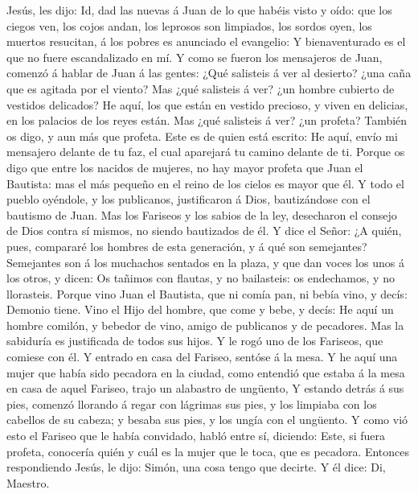 Jesús, les dijo: Id, dad las nuevas á Juan de lo que habéis visto y
oído: que los ciegos ven, los cojos andan, los leprosos son limpiados,
los sordos oyen, los muertos resucitan, á los pobres es anunciado el
evangelio:  Y bienaventurado es el que no fuere
escandalizado en mí.  Y como se fueron los mensajeros de
Juan, comenzó á hablar de Juan á las gentes: ¿Qué salisteis á ver al
desierto? ¿una caña que es agitada por el viento?  Mas ¿qué
salisteis á ver? ¿un hombre cubierto de vestidos delicados? He aquí, los
que están en vestido precioso, y viven en delicias, en los palacios de
los reyes están.  Mas ¿qué salisteis á ver? ¿un profeta?
También os digo, y aun más que profeta.  Este es de quien
está escrito: He aquí, envío mi mensajero delante de tu faz, el cual
aparejará tu camino delante de ti.  Porque os digo que
entre los nacidos de mujeres, no hay mayor profeta que Juan el Bautista:
mas el más pequeño en el reino de los cielos es mayor que él.
 Y todo el pueblo oyéndole, y los publicanos, justificaron
á Dios, bautizándose con el bautismo de Juan.  Mas los
Fariseos y los sabios de la ley, desecharon el consejo de Dios contra sí
mismos, no siendo bautizados de él.  Y dice el Señor: ¿A
quién, pues, compararé los hombres de esta generación, y á qué son
semejantes?  Semejantes son á los muchachos sentados en la
plaza, y que dan voces los unos á los otros, y dicen: Os tañimos con
flautas, y no bailasteis: os endechamos, y no llorasteis. 
Porque vino Juan el Bautista, que ni comía pan, ni bebía vino, y decís:
Demonio tiene.  Vino el Hijo del hombre, que come y bebe, y
decís: He aquí un hombre comilón, y bebedor de vino, amigo de publicanos
y de pecadores.  Mas la sabiduría es justificada de todos
sus hijos.  Y le rogó uno de los Fariseos, que comiese con
él. Y entrado en casa del Fariseo, sentóse á la mesa.  Y he
aquí una mujer que había sido pecadora en la ciudad, como entendió que
estaba á la mesa en casa de aquel Fariseo, trajo un alabastro de
ungüento,  Y estando detrás á sus pies, comenzó llorando á
regar con lágrimas sus pies, y los limpiaba con los cabellos de su
cabeza; y besaba sus pies, y los ungía con el ungüento.  Y
como vió esto el Fariseo que le había convidado, habló entre sí,
diciendo: Este, si fuera profeta, conocería quién y cuál es la mujer que
le toca, que es pecadora.  Entonces respondiendo Jesús, le
dijo: Simón, una cosa tengo que decirte. Y él dice: Di, Maestro.
